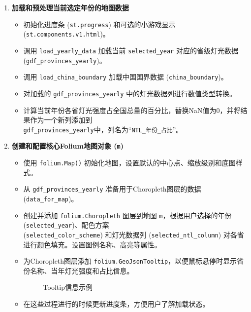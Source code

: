 \documentclass[14pt,a4paper,UTF8,twoside]{article}
\begin{document}
\begin{enumerate}
    \item \textbf{加载和预处理当前选定年份的地图数据}
        \begin{itemize}
            \item 初始化进度条 (\texttt{st.progress}) 和可选的小游戏显示 (\texttt{st.components.v1.html})。
            \item 调用 \texttt{load\_yearly\_data} 加载当前 \texttt{selected\_year} 对应的省级灯光数据 (\texttt{gdf\_provinces\_yearly})。
            \item 调用 \texttt{load\_china\_boundary} 加载中国国界数据 (\texttt{china\_boundary})。
            \item 对加载的 \texttt{gdf\_provinces\_yearly} 中的灯光数据列进行数值类型转换。
            \item 计算当前年份各省灯光强度占全国总量的百分比，替换NaN值为0，并将结果作为一个新列添加到\\ \texttt{gdf\_provinces\_yearly}中，列名为“\texttt{NTL\_年份\_占比}”。
        \end{itemize}

    \item \textbf{创建和配置核心Folium地图对象 (\texttt{m})}
        \begin{itemize}
            \item 使用 \texttt{folium.Map()} 初始化地图，设置默认的中心点、缩放级别和底图样式。
            \item 从 \texttt{gdf\_provinces\_yearly} 准备用于Choropleth图层的数据 (\texttt{data\_for\_map})。
            \item 创建并添加 \texttt{folium.Choropleth} 图层到地图 \texttt{m}，根据用户选择的年份 (\texttt{selected\_year})、配色方案 \\(\texttt{selected\_color\_scheme}) 和灯光数据列 (\texttt{selected\_ntl\_column}) 对各省进行颜色填充。设置图例名称、高亮等属性。
            \item 为Choropleth图层添加 \texttt{folium.GeoJsonTooltip}，以便鼠标悬停时显示省份名称、当年灯光强度和占比信息。
                \begin{figure}[H]
                    \centering
                    \caption{Tooltip信息示例}
                    \label{fig:choropleth_example}
                \end{figure}
            \item 在这些过程进行的时候更新进度条，方便用户了解加载状态。
        \end{itemize}


\end{enumerate}
\end{document}
